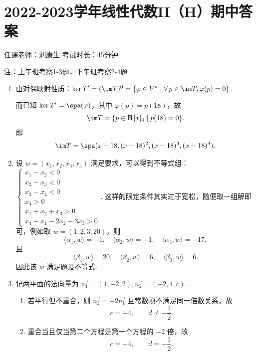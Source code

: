 \section{2022-2023学年线性代数II（H）期中答案}

\begin{center}
    任课老师：刘康生\hspace{4em} 考试时长：45分钟

    注：上午班考察1-3题，下午班考察2-4题
\end{center}
\begin{enumerate}
    \item 由对偶映射性质：$\ker T'=(\im T)^0=\{\varphi \in V^* \mid \forall\, p\in\im T, \varphi(p)=0\}$.

    而已知 $\ker T'=\spa(\varphi)$，其中 $\varphi(p)=p(18)$，故
    \[
        \im T=\{p\in\mathbf{R}[x]_4\mid p(18)=0\}.
    \]
    即
    \[
        \im T=\spa(x-18,(x-18)^2,(x-18)^3,(x-18)^4).
    \]

    \item 设 $w=(x_1, x_2, x_3, x_4)$ 满足要求，可以得到不等式组：$\begin{cases}
        x_1 - x_2 < 0 \\
        x_2 - x_3 < 0 \\
        x_3 - x_4 < 0 \\
        x_4 > 0 \\
        x_1 + x_2 + x_3 > 0 \\
        x_4 - x_1 - 2x_2 - 3x_3 > 0
    \end{cases}$. 这样的限定条件其实过于宽松，随便取一组解即可，例如取 $w=(1,2,3,20)$，则
    \[
        \langle\alpha_1,w\rangle=-1,\quad
        \langle\alpha_2,w\rangle=-1,\quad
        \langle\alpha_3,w\rangle=-17,
    \]
    且
    \[
        \langle\beta_1,w\rangle=20,\quad
        \langle\beta_2,w\rangle=6,\quad
        \langle\beta_3,w\rangle=6.
    \]
    因此该 $w$ 满足题设不等式.

    \item 记两平面的法向量为 $\vec{n_1}=(1,-2,2), \vec{n_2}=(-2,4,c)$.
    \begin{enumerate}
        \item 若平行但不重合，则 $\vec{n_2}=-2\vec{n_1}$ 且常数项不满足同一倍数关系，故
        \[
            c=-4,\qquad d\neq -\frac12.
        \]

        \item 重合当且仅当第二个方程是第一个方程的 $-2$ 倍，故
        \[
            c=-4,\qquad d=-\frac12.
        \]


\end{enumerate}
\end{enumerate}
